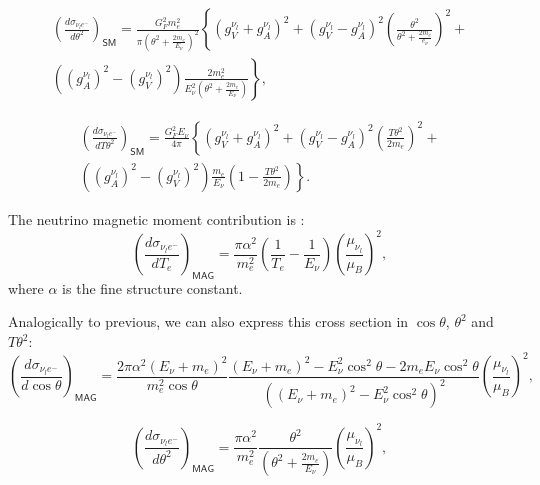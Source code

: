 \begin{multline}
\left(\frac{d\sigma_{\nu_le^-}}{d\theta^2}\right)_{\textsf{SM}}=
\frac{G_F^2m_e^2}{\pi\left(\theta^2+\frac{2m_e}{E_{\nu}}\right)^2}
\left\lbrace
\left(g_V^{\nu_l}+g_A^{\nu_l}\right)^2+\left(g_V^{\nu_l}-g_A^{\nu_l}\right)^2
\left(\frac{\theta^2}{\theta^2+\frac{2m_e}{e_{\nu}}}\right)^2\right. +\\
\left.\left(\left(g_A^{\nu_l}\right)^2-\left(g_V^{\nu_l}\right)^2\right)
\frac{2m_e^2}{E_{\nu}^2\left(\theta^2+\frac{2m_e}{E_{\nu}}\right)}\right\rbrace,
\end{multline}

\begin{multline}
\left(\frac{d\sigma_{\nu_le^-}}{dT\theta^2}\right)_{\textsf{SM}}=
\frac{G_F^2E_{\nu}}{4\pi}
\left\lbrace
\left(g_V^{\nu_l}+g_A^{\nu_l}\right)^2+\left(g_V^{\nu_l}-g_A^{\nu_l}\right)^2
\left(\frac{T\theta^2}{2m_e}\right)^2\right. +\\
\left.\left(\left(g_A^{\nu_l}\right)^2-\left(g_V^{\nu_l}\right)^2\right)
\frac{m_e}{E_{\nu}}\left(1-\frac{T\theta^2}{2m_e}\right)\right\rbrace.
\end{multline}

The neutrino magnetic moment contribution is  \cite{nuElmagInt2015.pdf}:
\begin{equation}
\left(\frac{d\sigma_{\nu_le^-}}{dT_e}\right)_{\textsf{MAG}}=\frac{\pi\alpha^2}{m_e^2}\left(\frac{1}{T_e}-\frac{1}{E_{\nu}}\right)\left(\frac{\mu_{\nu_l}}{\mu_B}\right)^2,
\end{equation}
where $\alpha$ is the fine structure constant.

Analogically to previous, we can also express this cross section in $\cos\theta$, $\theta^2$ and $T\theta^2$:
\begin{equation}
\left(\frac{d\sigma_{\nu_le^-}}{d\cos\theta}\right)_{\textsf{MAG}}=
\frac{2\pi\alpha^2\left(E_{\nu}+m_e\right)^2}{m_e^2\cos\theta}
\frac{\left(E_{\nu}+m_e\right)^2-E_{\nu}^2\cos^2\theta-2m_eE_{\nu}\cos^2\theta}{\left(\left(E_{\nu}+m_e\right)^2-E_{\nu}^2\cos^2\theta\right)^2}
\left(\frac{\mu_{\nu_l}}{\mu_B}\right)^2,
\end{equation}

\begin{equation}
\left(\frac{d\sigma_{\nu_le^-}}{d\theta^2}\right)_{\textsf{MAG}}=\frac{\pi\alpha^2}{m_e^2}\frac{\theta^2}{\left(\theta^2+\frac{2m_e}{E_{\nu}}\right)}\left(\frac{\mu_{\nu_l}}{\mu_B}\right)^2,
\end{equation}

